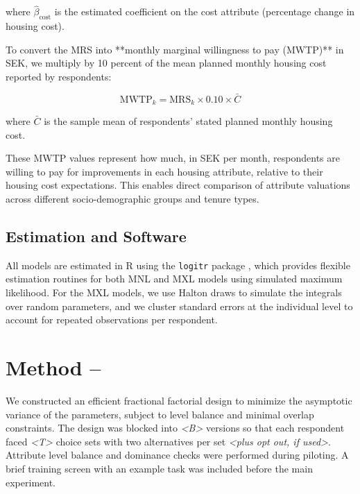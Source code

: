 \documentclass[3p,11pt ]{elsarticle}
\begin{document}
\noindent where \( \hat{\beta}_{\text{cost}} \) is the estimated coefficient on the cost attribute (percentage change in housing cost).

To convert the MRS into **monthly marginal willingness to pay (MWTP)** in SEK, we multiply by 10 percent of the mean planned monthly housing cost reported by respondents:

\begin{equation}
\text{MWTP}_k = \text{MRS}_k \times 0.10 \times \bar{C}
\end{equation}

\noindent where \( \bar{C} \) is the sample mean of respondents' stated planned monthly housing cost.

These MWTP values represent how much, in SEK per month, respondents are willing to pay for improvements in each housing attribute, relative to their housing cost expectations. This enables direct comparison of attribute valuations across different socio-demographic groups and tenure types.

\subsection{Estimation and Software}

All models are estimated in R using the \texttt{logitr} package \citep{helvestonLogitrFastEstimation2022}, which provides flexible estimation routines for both MNL and MXL models using simulated maximum likelihood. For the MXL models, we use Halton draws to simulate the integrals over random parameters, and we cluster standard errors at the individual level to account for repeated observations per respondent.



\section{Method -- }

We constructed an efficient fractional factorial design to minimize the asymptotic variance of the parameters, subject to level balance and minimal overlap constraints. The design was blocked into \textit{<B>} versions so that each respondent faced \textit{<T>} choice sets with two alternatives per set \textit{<plus opt out, if used>}. Attribute level balance and dominance checks were performed during piloting. A brief training screen with an example task was included before the main experiment.
\end{document}
